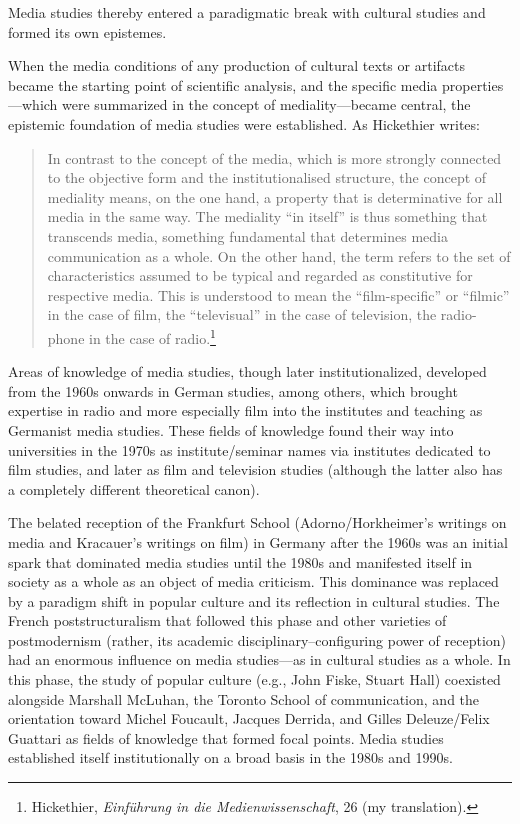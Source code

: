 \documentclass{tufte-handout}
\begin{document}
\noindent Media studies thereby entered a paradigmatic break with cultural studies
and formed its own epistemes.

When the media conditions of any production of cultural texts or
artifacts became the starting point of scientific analysis, and the
specific media properties---which were summarized in the concept of
mediality---became central, the epistemic foundation of media studies
were established. As Hickethier writes:

\begin{quote}
In contrast to the concept of the media, which is more strongly
connected to the objective form and the institutionalised structure, the
concept of mediality means, on the one hand, a property that is
determinative for all media in the same way. The mediality ``in itself''
is thus something that transcends media, something fundamental that
determines media communication as a whole. On the other hand, the term
refers to the set of characteristics assumed to be typical and regarded
as constitutive for respective media. This is understood to mean the
``film-specific'' or ``filmic'' in the case of film, the ``televisual''
in the case of television, the radio-phone in the case of
radio.\footnote{Hickethier, \emph{Einführung in die Medienwissenschaft},
  26 (my translation).}
\end{quote}

\noindent Areas of knowledge of media studies, though later institutionalized,
developed from the 1960s onwards in German studies, among others, which
brought expertise in radio and more especially film into the institutes
and teaching as Germanist media studies. These fields of knowledge found
their way into universities in the 1970s as institute/seminar names via
institutes dedicated to film studies, and later as film and television
studies (although the latter also has a completely different theoretical
canon).

The belated reception of the Frankfurt School (Adorno/Horkheimer's
writings on media and Kracauer's writings on film) in Germany after the
1960s was an initial spark that dominated media studies until the 1980s
and manifested itself in society as a whole as an object of media
criticism. This dominance was replaced by a paradigm shift in popular
culture and its reflection in cultural studies. The French
poststructuralism that followed this phase and other varieties of
postmodernism (rather, its academic disciplinary--configuring power of
reception) had an enormous influence on media studies---as in cultural
studies as a whole. In this phase, the study of popular culture (e.g.,
John Fiske, Stuart Hall) coexisted alongside Marshall McLuhan, the
Toronto School of communication, and the orientation toward Michel
Foucault, Jacques Derrida, and Gilles Deleuze/Felix Guattari as fields
of knowledge that formed focal points. Media studies established itself
institutionally on a broad basis in the 1980s and 1990s.
\end{document}

